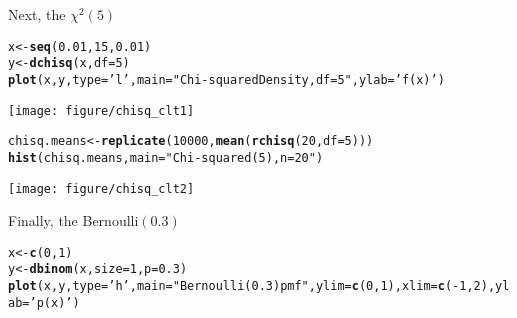 \documentclass[addpoints,12pt]{exam}\usepackage[]{graphicx}\usepackage[]{color}
\makeatletter
\def\maxwidth{ %
  \ifdim\Gin@nat@width>\linewidth
    \linewidth
  \else
    \Gin@nat@width
  \fi
}
\newcommand{\hlnum}[1]{\textcolor[rgb]{0.686,0.059,0.569}{#1}}%
\newcommand{\hlstr}[1]{\textcolor[rgb]{0.192,0.494,0.8}{#1}}%
\newcommand{\hlopt}[1]{\textcolor[rgb]{0,0,0}{#1}}%
\newcommand{\hlstd}[1]{\textcolor[rgb]{0.345,0.345,0.345}{#1}}%
\newcommand{\hlkwb}[1]{\textcolor[rgb]{0.69,0.353,0.396}{#1}}%
\newcommand{\hlkwc}[1]{\textcolor[rgb]{0.333,0.667,0.333}{#1}}%
\newcommand{\hlkwd}[1]{\textcolor[rgb]{0.737,0.353,0.396}{\textbf{#1}}}%
\newenvironment{kframe}{%
 \def\at@end@of@kframe{}%
 \ifinner\ifhmode%
  \def\at@end@of@kframe{\end{minipage}}%
  \begin{minipage}{\columnwidth}%
 \fi\fi%
 \def\FrameCommand##1{\hskip\@totalleftmargin \hskip-\fboxsep
 \colorbox{shadecolor}{##1}\hskip-\fboxsep
     \hskip-\linewidth \hskip-\@totalleftmargin \hskip\columnwidth}%
 \MakeFramed {\advance\hsize-\width
   \@totalleftmargin\z@ \linewidth\hsize
   \@setminipage}}%
 {\par\unskip\endMakeFramed%
 \at@end@of@kframe}
\newenvironment{knitrout}{}{} %
\makeatother
\begin{document}
\begin{questions}
\begin{solution}
\begin{knitrout}
\end{knitrout}
Next, the $\chi^2(5)$	
\begin{knitrout}
\color{fgcolor}\begin{kframe}
\begin{alltt}
\hlstd{x} \hlkwb{<-} \hlkwd{seq}\hlstd{(}\hlnum{0.01}\hlstd{,} \hlnum{15}\hlstd{,} \hlnum{0.01}\hlstd{)}
\hlstd{y} \hlkwb{<-} \hlkwd{dchisq}\hlstd{(x,} \hlkwc{df} \hlstd{=} \hlnum{5}\hlstd{)}
\hlkwd{plot}\hlstd{(x,y,} \hlkwc{type} \hlstd{=} \hlstr{'l'}\hlstd{,} \hlkwc{main} \hlstd{=} \hlstr{"Chi-squared Density, df = 5"}\hlstd{,} \hlkwc{ylab} \hlstd{=} \hlstr{'f(x)'}\hlstd{)}
\end{alltt}
\end{kframe}

{\centering \texttt{[image: figure/chisq\_clt1]} 

}


\begin{kframe}\begin{alltt}
\hlstd{chisq.means} \hlkwb{<-} \hlkwd{replicate}\hlstd{(}\hlnum{10000}\hlstd{,} \hlkwd{mean}\hlstd{(}\hlkwd{rchisq}\hlstd{(}\hlnum{20}\hlstd{,} \hlkwc{df} \hlstd{=} \hlnum{5}\hlstd{)))}
\hlkwd{hist}\hlstd{(chisq.means,} \hlkwc{main} \hlstd{=} \hlstr{"Chi-squared(5), n = 20"}\hlstd{)}
\end{alltt}
\end{kframe}

{\centering \texttt{[image: figure/chisq\_clt2]} 

}



\end{knitrout}
Finally, the Bernoulli$(0.3)$
\begin{knitrout}
\color{fgcolor}\begin{kframe}
\begin{alltt}
\hlstd{x} \hlkwb{<-} \hlkwd{c}\hlstd{(}\hlnum{0}\hlstd{,}\hlnum{1}\hlstd{)}
\hlstd{y} \hlkwb{<-} \hlkwd{dbinom}\hlstd{(x,} \hlkwc{size} \hlstd{=} \hlnum{1}\hlstd{,} \hlkwc{p} \hlstd{=} \hlnum{0.3}\hlstd{)}
\hlkwd{plot}\hlstd{(x, y,} \hlkwc{type} \hlstd{=} \hlstr{'h'}\hlstd{,} \hlkwc{main} \hlstd{=} \hlstr{"Bernoulli(0.3) pmf"}\hlstd{,} \hlkwc{ylim} \hlstd{=} \hlkwd{c}\hlstd{(}\hlnum{0}\hlstd{,}\hlnum{1}\hlstd{),} \hlkwc{xlim} \hlstd{=} \hlkwd{c}\hlstd{(}\hlopt{-}\hlnum{1}\hlstd{,} \hlnum{2}\hlstd{),} \hlkwc{ylab} \hlstd{=} \hlstr{'p(x)'}\hlstd{)}
\end{alltt}
\end{kframe}


\end{knitrout}
\end{solution}
\end{questions}
\end{document}

